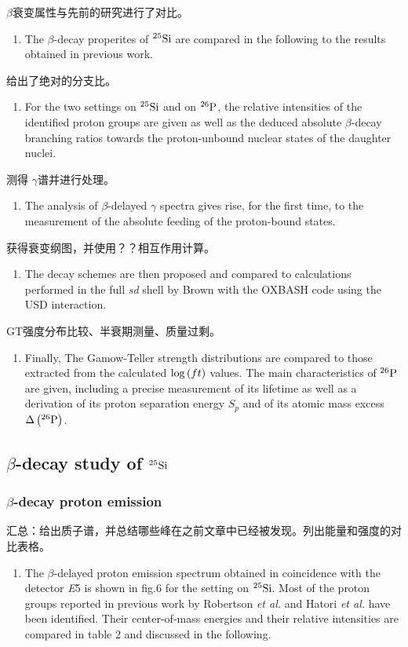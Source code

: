 \documentclass[UTF8]{ctexart}
\begin{document}
$\beta$衰变属性与先前的研究进行了对比。
\begin{enumerate}
    \item The $\beta$-decay properites of $^{25}\textnormal{Si}$ are compared in the following to the results obtained in previous work.
\end{enumerate}
给出了绝对的分支比。
\begin{enumerate}
    \item For the two settings on $^{25}\textnormal{Si}$ and on $^{26}\textnormal{P}$, the relative intensities of the identified proton groups are given as well as the deduced absolute $\beta$-decay branching ratios towards the proton-unbound nuclear states of the daughter nuclei.
\end{enumerate}
测得 $\gamma$谱并进行处理。
\begin{enumerate}
    \item The analysis of $\beta$-delayed $\gamma$ spectra gives rise, for the first time, to the measurement of the absolute feeding of the proton-bound states.
\end{enumerate}
获得衰变纲图，并使用？？相互作用计算。
\begin{enumerate}
    \item The decay schemes are then proposed and compared to calculations performed in the full \textit{sd} shell by Brown with the OXBASH code using the USD interaction.
\end{enumerate}
GT强度分布比较、半衰期测量、质量过剩。
\begin{enumerate}
    \item  Finally, The Gamow-Teller strength distributions are compared to those extracted from the calculated $\textnormal{log}\left( ft \right)$ values. The main characteristics of $^{26}\textnormal{P}$ are given, including a precise measurement of its lifetime as well as a derivation of its proton separation energy $S_{p}$ and of its atomic mass excess $\Delta \left( ^{26}\textnormal{P} \right)$.

\end{enumerate}

\subsection{$\beta$-decay study of $^{25}\textnormal{Si}$}
\subsubsection{$\beta$-decay proton emission}
汇总：给出质子谱，并总结哪些峰在之前文章中已经被发现。列出能量和强度的对比表格。
\begin{enumerate}
    \item The $\beta$-delayed proton emission spectrum obtained in coincidence with the detector \textit{E}5 is shown in fig.6 for the setting on $^{25}\textnormal{Si}$. Most of the proton groups reported in previous work by Robertson \textit{et al.} and Hatori \textit{et al.} have been identified. Their center-of-mass energies and their relative intensities are compared in table 2 and discussed in the following.
\end{enumerate}
\end{document}
